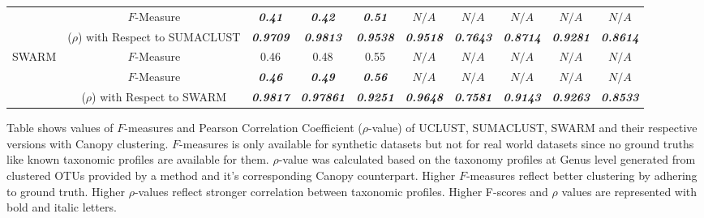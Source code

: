 \documentclass[10pt, conference, compsocconf]{IEEEtran}
\begin{document}
\begin{table}[t]
{\begin{tabular}{|l|c c c c| c c c c c|}
			\hdashline
			
			\multirow{2}{*}{CC$_{SUMACLUST}$} & $F$-Measure & \textit{\textbf{0.41}} & \textit{\textbf{0.42}} & \textit{\textbf{0.51}} & $N/A$ & $N/A$ & $N/A$ & $N/A$ & $N/A$\\
			& ($\rho$) with Respect to SUMACLUST & \textit{\textbf{0.9709}} & \textit{\textbf{0.9813}} & \textit{\textbf{0.9538}} & \textit{\textbf{0.9518}} & \textit{\textbf{0.7643}} & \textit{\textbf{0.8714}} & \textit{\textbf{0.9281}} & \textit{\textbf{0.8614}}\\ 
			
			\hline
			
			\multirow{1}{*}{SWARM} & $F$-Measure & 0.46 & 0.48 & 0.55 & $N/A$ & $N/A$ & $N/A$ & $N/A$ & $N/A$\\
			
			\hdashline
			
			\multirow{2}{*}{CC$_{SWARM}$} & $F$-Measure & \textit{\textbf{0.46}} & \textit{\textbf{0.49}} & \textit{\textbf{0.56}} & $N/A$ & $N/A$ & $N/A$ & $N/A$ & $N/A$\\
			& ($\rho$) with Respect to SWARM & \textit{\textbf{0.9817}} & \textit{\textbf{0.97861}} & \textit{\textbf{0.9251}} & \textit{\textbf{0.9648}} & \textit{\textbf{0.7581}} & \textit{\textbf{0.9143}} & \textit{\textbf{0.9263}} & \textit{\textbf{0.8533}}\\
			
			\hline
			
		\end{tabular}
	}
	\small
	\begin{tablenotes}
		\item Table shows values of $F$-measures and Pearson Correlation Coefficient ($\rho$-value) of UCLUST, SUMACLUST, SWARM and their respective versions with Canopy clustering. $F$-measures is only available for synthetic datasets but not for real world datasets since no ground truths like known taxonomic profiles are available for them. $\rho$-value was calculated based on the taxonomy profiles at Genus level generated from clustered OTUs provided by a method and it's corresponding Canopy counterpart. Higher $F$-measures reflect better clustering by adhering to ground truth. Higher $\rho$-values reflect stronger correlation between taxonomic profiles. Higher F-scores and $\rho$ values are represented with bold and italic letters.         
	\end{tablenotes}
	
\end{table}
\end{document}

